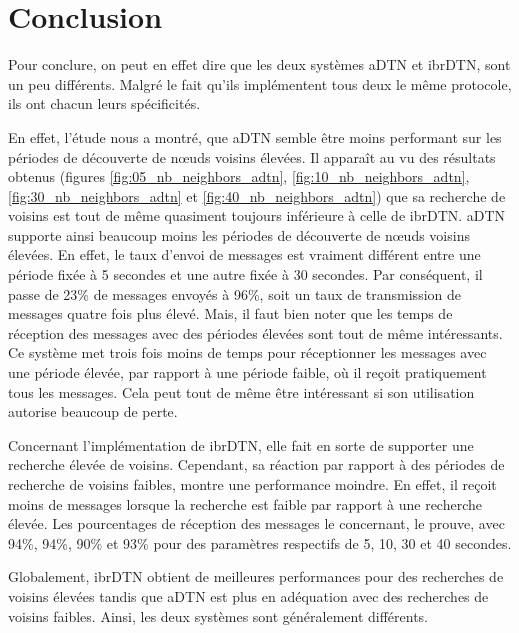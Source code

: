 \documentclass[a4paper,10pt]{article}
\begin{document}
\section{Conclusion}
Pour conclure, on peut en effet dire que les deux systèmes aDTN et ibrDTN, sont un peu différents. Malgré le fait qu’ils implémentent tous deux le même protocole, ils ont chacun leurs spécificités.\par
En effet, l'étude nous a montré, que aDTN semble être moins performant sur les périodes de découverte de nœuds voisins élevées. Il apparaît au vu des résultats obtenus (figures \ref{fig:05_nb_neighbors_adtn}, \ref{fig:10_nb_neighbors_adtn}, \ref{fig:30_nb_neighbors_adtn} et \ref{fig:40_nb_neighbors_adtn}) que sa recherche de voisins est tout de même quasiment toujours inférieure à celle de ibrDTN. aDTN supporte ainsi beaucoup moins les périodes de découverte de nœuds voisins élevées. En effet, le taux d’envoi de messages est vraiment différent entre une période fixée à 5 secondes et une autre fixée à 30 secondes. Par conséquent, il passe de 23\% de messages envoyés à 96\%, soit un taux de transmission de messages quatre fois plus élevé. Mais, il faut bien noter que les temps de réception des messages avec des périodes élevées sont tout de même intéressants. Ce système met trois fois moins de temps pour réceptionner les messages avec une période élevée, par rapport à une période faible, où il reçoit pratiquement tous les messages. Cela peut tout de même être intéressant si son utilisation autorise beaucoup de perte.\par
Concernant l’implémentation de ibrDTN, elle fait en sorte de supporter une recherche élevée de voisins. Cependant, sa réaction par rapport à des périodes de recherche de voisins faibles, montre une performance moindre. En effet, il reçoit moins de messages lorsque la recherche est faible par rapport à une recherche élevée. Les pourcentages de réception des messages le concernant, le prouve, avec 94\%, 94\%, 90\% et 93\% pour des paramètres respectifs de 5, 10, 30 et 40 secondes.\par
Globalement, ibrDTN obtient de meilleures performances pour des recherches de voisins élevées tandis que aDTN est plus en adéquation avec des recherches de voisins faibles. Ainsi, les deux systèmes sont généralement différents.


\newpage



\end{document}
